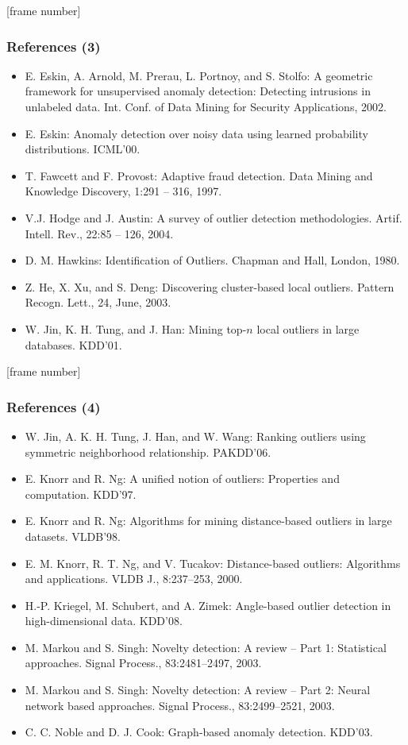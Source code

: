 \documentclass[aspectratio=169,t,xcolor=dvipsnames]{beamer}
\begin{document}
{
  [frame number]
  \begin{frame}
  	\frametitle{References (3)}
  	\begin{itemize}
  		\item E. Eskin, A. Arnold, M. Prerau, L. Portnoy, and S. Stolfo: A geometric framework for unsupervised anomaly detection: Detecting intrusions in unlabeled data. Int. Conf. of Data Mining for Security Applications, 2002.
  		\item E. Eskin: Anomaly detection over noisy data using learned probability distributions. ICML'00.
  		\item T. Fawcett and F. Provost: Adaptive fraud detection. Data Mining and Knowledge Discovery, 1:291 -- 316, 1997.
  		\item V.J. Hodge and J. Austin: A survey of outlier detection methodologies. Artif. Intell. Rev., 22:85 -- 126, 2004.
  		\item D. M. Hawkins: Identification of Outliers. Chapman and Hall, London, 1980.
  		\item Z. He, X. Xu, and S. Deng: Discovering cluster-based local outliers. Pattern Recogn. Lett., 24, June, 2003.
  		\item W. Jin, K. H. Tung, and J. Han: Mining top-$n$ local outliers in large databases. KDD'01.
  	\end{itemize}
  \end{frame}
}

{
  [frame number]
  \begin{frame}
	\frametitle{References (4)}
	\begin{itemize}
		\item W. Jin, A. K. H. Tung, J. Han, and W. Wang: Ranking outliers using symmetric neighborhood relationship. PAKDD'06.
		\item E. Knorr and R. Ng: A unified notion of outliers: Properties and computation. KDD'97.
		\item E. Knorr and R. Ng: Algorithms for mining distance-based outliers in large datasets. VLDB'98.
		\item E. M. Knorr, R. T. Ng, and V. Tucakov: Distance-based outliers: Algorithms and applications. VLDB J., 8:237–253, 2000.
		\item H.-P. Kriegel, M. Schubert, and A. Zimek: Angle-based outlier detection in high-dimensional data. KDD'08.
		\item M. Markou and S. Singh: Novelty detection: A review -- Part 1: Statistical approaches. Signal Process., 83:2481–2497, 2003.
		\item M. Markou and S. Singh: Novelty detection: A review -- Part 2: Neural network based approaches. Signal Process., 83:2499–2521, 2003.
		\item C. C. Noble and D. J. Cook: Graph-based anomaly detection. KDD'03.
	\end{itemize}
\end{frame}
}
\end{document}

